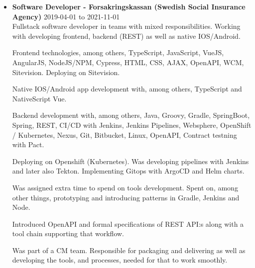 \documentclass[a4paper]{article}
\begin{document}
\begin{itemize}
  \item \textbf{Software Developer - Forsakringskassan (Swedish Social Insurance Agency)} 2019-04-01 to 2021-11-01 \\

  Fullstack software developer in teams with mixed responsibilities. Working with developing frontend, backend (REST) as well as native IOS/Android.

  Frontend technologies, among others, TypeScript, JavaScript, VueJS, AngularJS, NodeJS/NPM, Cypress, HTML, CSS, AJAX, OpenAPI, WCM, Sitevision. Deploying on Sitevision.

  Native IOS/Android app development with, among others, TypeScript and NativeScript Vue.
  
  Backend development with, among others, Java, Groovy, Gradle, SpringBoot, Spring, REST, CI/CD with Jenkins, Jenkins Pipelines, Websphere, OpenShift / Kubernetes, Nexus, Git, Bitbucket, Linux, OpenAPI, Contract testning with Pact.

  Deploying on Openshift (Kubernetes). Was developing pipelines with Jenkins and later also Tekton. Implementing Gitops with ArgoCD and Helm charts.

  Was assigned extra time to spend on tools development. Spent on, among other things, prototyping and introducing patterns in Gradle, Jenkins and Node.
  
  Introduced OpenAPI and formal specifications of REST API:s along with a tool chain supporting that workflow.
  
  Was part of a CM team. Responsible for packaging and delivering as well as developing the tools, and processes, needed for that to work smoothly.
\end{itemize}
  
\end{document}
